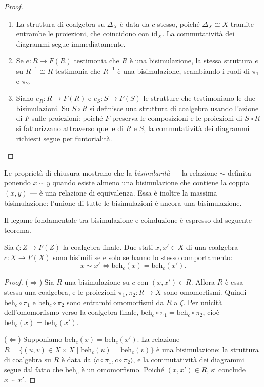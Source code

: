 \begin{proof}
  \begin{enumerate}
    \item La struttura di coalgebra su \(\Delta_X\) è data da \(c\) stesso, poiché \(\Delta_X \cong X\) tramite entrambe le proiezioni, che coincidono con \(\mathrm{id}_X\). La commutatività dei diagrammi segue immediatamente.
    \item Se \(e : R \to F(R)\) testimonia che \(R\) è una bisimulazione, la stessa struttura \(e\) su \(R^{-1} \cong R\) testimonia che \(R^{-1}\) è una bisimulazione, scambiando i ruoli di \(\pi_1\) e \(\pi_2\).
    \item Siano \(e_R : R \to F(R)\) e \(e_S : S \to F(S)\) le strutture che testimoniano le due bisimulazioni. Su \(S \circ R\) si definisce una struttura di coalgebra usando l'azione di \(F\) sulle proiezioni: poiché \(F\) preserva le composizioni e le proiezioni di \(S \circ R\) si fattorizzano attraverso quelle di \(R\) e \(S\), la commutatività dei diagrammi richiesti segue per funtorialità.
  \end{enumerate}
\end{proof}

Le proprietà di chiusura mostrano che la \textit{bisimilarità} — la relazione \(\sim\) definita ponendo \(x \sim y\) quando esiste almeno una bisimulazione che contiene la coppia \((x, y)\) — è una relazione di equivalenza. Essa è inoltre la massima bisimulazione: l'unione di tutte le bisimulazioni è ancora una bisimulazione.

Il legame fondamentale tra bisimulazione e coinduzione è espresso dal seguente teorema.

\begin{theorem}
  Sia \(\zeta : Z \to F(Z)\) la coalgebra finale. Due stati \(x, x' \in X\) di una coalgebra \(c : X \to F(X)\) sono bisimili se e solo se hanno lo stesso comportamento:
  \[
    x \sim x' \iff \mathrm{beh}_c(x) = \mathrm{beh}_c(x').
  \]
\end{theorem}

\begin{proof}
  (\(\Rightarrow\)) Sia \(R\) una bisimulazione su \(c\) con \((x, x') \in R\). Allora \(R\) è essa stessa una coalgebra, e le proiezioni \(\pi_1, \pi_2 : R \to X\) sono omomorfismi. Quindi \(\mathrm{beh}_c \circ \pi_1\) e \(\mathrm{beh}_c \circ \pi_2\) sono entrambi omomorfismi da \(R\) a \(\zeta\). Per unicità dell'omomorfismo verso la coalgebra finale, \(\mathrm{beh}_c \circ \pi_1 = \mathrm{beh}_c \circ \pi_2\), cioè \(\mathrm{beh}_c(x) = \mathrm{beh}_c(x')\).

  (\(\Leftarrow\)) Supponiamo \(\mathrm{beh}_c(x) = \mathrm{beh}_c(x')\). La relazione \(R = \{(u, v) \in X \times X \mid \mathrm{beh}_c(u) = \mathrm{beh}_c(v)\}\) è una bisimulazione: la struttura di coalgebra su \(R\) è data da \(\langle c \circ \pi_1, c \circ \pi_2 \rangle\), e la commutatività dei diagrammi segue dal fatto che \(\mathrm{beh}_c\) è un omomorfismo. Poiché \((x, x') \in R\), si conclude \(x \sim x'\).
\end{proof}

